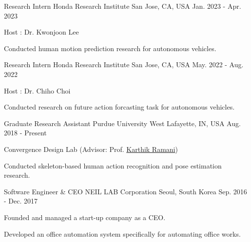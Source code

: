 


\begin{cventries}

\cventry
{Research Intern} %
{Honda Research Institute} %
{San Jose, CA, USA} %
{Jan. 2023 - Apr. 2023} %
{ %
\begin{cvitems}
\item {Host : Dr. Kwonjoon Lee}
\item {Conducted human motion prediction research for autonomous vehicles.}
\end{cvitems}
}

\cventry
{Research Intern} %
{Honda Research Institute} %
{San Jose, CA, USA} %
{May. 2022 - Aug. 2022} %
{ %
\begin{cvitems}
\item {Host : Dr. Chiho Choi}
\item {Conducted research on future action forcasting task for autonomous vehicles.}
\end{cvitems}
}

\cventry
{Graduate Research Assistant} %
{Purdue University} %
{West Lafayette, IN, USA} %
{Aug. 2018 - Present} %
{ %
\begin{cvitems}
\item {Convergence Design Lab (Advisor: Prof. \href{https://engineering.purdue.edu/~ramani/wordpress/about/}{Karthik Ramani})}
\item {Conducted skeleton-based human action recognition and pose estimation research.}
\end{cvitems}
}

\cventry
{Software Engineer \& CEO} %
{NEIL LAB Corporation} %
{Seoul, South Korea} %
{Sep. 2016 - Dec. 2017} %
{ %
\begin{cvitems}
\item {Founded and managed a start-up company as a CEO.}
\item {Developed an office automation system specifically for automating office works.}
\end{cvitems}
}


\end{cventries}
